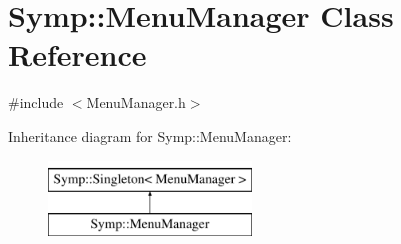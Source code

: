 \hypertarget{class_symp_1_1_menu_manager}{\section{Symp\-:\-:Menu\-Manager Class Reference}
\label{class_symp_1_1_menu_manager}
}


{\ttfamily \#include $<$Menu\-Manager.\-h$>$}

Inheritance diagram for Symp\-:\-:Menu\-Manager\-:\begin{figure}[H]
\begin{center}
\leavevmode
\includegraphics[height=2.000000cm]{class_symp_1_1_menu_manager}
\end{center}
\end{figure}
